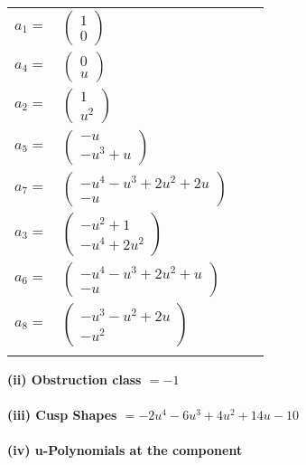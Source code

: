 \documentclass[1p]{elsarticle_modified}
\theoremstyle{definition}
\begin{document}
\begin{tabular}{m{7pt} m{180pt} m{7pt} m{180pt} }
\flushright $a_{1}=$&$\begin{pmatrix}1\\0\end{pmatrix}$ \\
\flushright $a_{4}=$&$\begin{pmatrix}0\\u\end{pmatrix}$ \\
\flushright $a_{2}=$&$\begin{pmatrix}1\\u^2\end{pmatrix}$ \\
\flushright $a_{5}=$&$\begin{pmatrix}- u\\- u^3+u\end{pmatrix}$ \\
\flushright $a_{7}=$&$\begin{pmatrix}- u^4- u^3+2 u^2+2 u\\- u\end{pmatrix}$ \\
\flushright $a_{3}=$&$\begin{pmatrix}- u^2+1\\- u^4+2 u^2\end{pmatrix}$ \\
\flushright $a_{6}=$&$\begin{pmatrix}- u^4- u^3+2 u^2+u\\- u\end{pmatrix}$ \\
\flushright $a_{8}=$&$\begin{pmatrix}- u^3- u^2+2 u\\- u^2\end{pmatrix}$\\&\end{tabular}
\flushleft \textbf{(ii) Obstruction class $= -1$}\\~\\
\flushleft \textbf{(iii) Cusp Shapes $= -2 u^4-6 u^3+4 u^2+14 u-10$}\\~\\
\newpage\renewcommand{\arraystretch}{1}
\flushleft \textbf{(iv) u-Polynomials at the component}\newline \\
\end{document}

